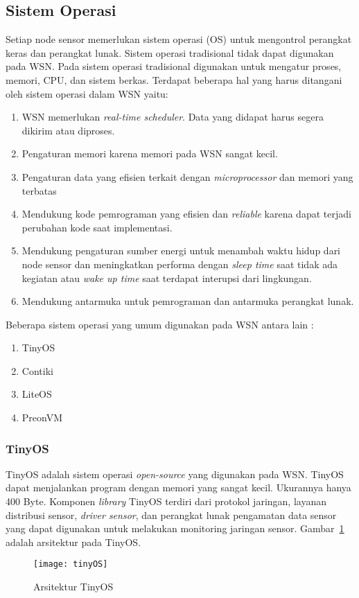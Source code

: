\subsection{Sistem Operasi}
Setiap node sensor memerlukan sistem operasi (OS) untuk mengontrol perangkat keras dan perangkat lunak. Sistem operasi tradisional tidak dapat digunakan pada WSN. Pada sistem operasi tradisional digunakan untuk mengatur proses, memori, CPU, dan sistem berkas.\cite{fundamentals:0:fundamental} Terdapat beberapa hal yang harus ditangani oleh sistem operasi dalam WSN yaitu:
\begin{enumerate}
	\item WSN memerlukan \textit{real-time scheduler}. Data yang didapat harus segera dikirim atau diproses.
	\item Pengaturan memori karena memori pada WSN sangat kecil.
	\item Pengaturan data yang efisien terkait dengan \textit{microprocessor} dan memori yang terbatas
	\item Mendukung kode pemrograman yang efisien dan \textit{reliable} karena dapat terjadi perubahan kode saat implementasi.
	\item Mendukung pengaturan sumber energi untuk menambah waktu hidup dari node sensor dan meningkatkan performa dengan \textit{sleep time} saat tidak ada kegiatan atau \textit{wake up time} saat terdapat interupsi dari lingkungan.
	\item Mendukung antarmuka untuk pemrograman dan antarmuka perangkat lunak. 
\end{enumerate}

Beberapa sistem operasi yang umum digunakan pada WSN antara lain :
\begin{enumerate}
	\item TinyOS
	\item Contiki
	\item LiteOS
	\item PreonVM
\end{enumerate}

\subsubsection{TinyOS \cite{DBLP:journals/sensors/FarooqK11}}
TinyOS adalah sistem operasi \textit{open-source} yang digunakan pada WSN. TinyOS dapat menjalankan program dengan memori yang sangat kecil. Ukurannya hanya 400 Byte. Komponen \textit{library} TinyOS terdiri dari protokol jaringan, layanan distribusi sensor, \textit{driver sensor}, dan perangkat lunak pengamatan data sensor yang dapat digunakan untuk melakukan monitoring jaringan sensor. Gambar~\ref{fig:tinyOS} adalah arsitektur pada TinyOS.  
\begin{figure} [H]
	\centering  
	\texttt{[image: tinyOS]}  
	\caption[Arsitektur TinyOS]{Arsitektur TinyOS} 
	\label{fig:tinyOS} 
\end{figure}

